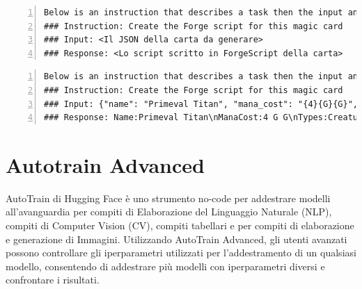 \begin{algorithm}[ht]
	\caption{Struttura prompt per l'addestramento}
	\label{lst:train_prompt_structure}
	\begin{Verbatim}[numbers=left,breaklines]
Below is an instruction that describes a task then the input and response. 
### Instruction: Create the Forge script for this magic card 
### Input: <Il JSON della carta da generare>
### Response: <Lo script scritto in ForgeScript della carta> 
	\end{Verbatim}
\end{algorithm}

\begin{algorithm}[ht]
	\caption{Esempio di prompt per l'addestramento}
	\label{lst:train_prompt_example}
    \scriptsize
	\begin{Verbatim}[numbers=left,breaklines]
Below is an instruction that describes a task then the input and response. 
### Instruction: Create the Forge script for this magic card 
### Input: {"name": "Primeval Titan", "mana_cost": "{4}{G}{G}", "type_line": "Creature \u2014 Giant", "oracle_text": "Trample\nWhenever Primeval Titan enters the battlefield or attacks, you may search your library for up to two land cards, put them onto the battlefield tapped, then shuffle.", "power": "6", "toughness": "6"} 
### Response: Name:Primeval Titan\nManaCost:4 G G\nTypes:Creature Giant\nPT:6/6\nK:Trample\nT:Mode$ ChangesZone | Origin$ Any | Destination$ Battlefield | ValidCard$ Card.Self | Execute$ TrigChange | OptionalDecider$ You | TriggerDescription$ Whenever CARDNAME enters the battlefield or attacks, you may search your library for up to two land cards, put them onto the battlefield tapped, then shuffle.\nT:Mode$ Attacks | ValidCard$ Card.Self | Execute$ TrigChange | TriggerZones$ Battlefield | OptionalDecider$ You | Secondary$ True | TriggerDescription$ Whenever CARDNAME enters the battlefield or attacks, you may search your library for up to two land cards, put them onto the battlefield tapped, then shuffle.\nSVar:TrigChange:DB$ ChangeZone | Origin$ Library | Destination$ Battlefield | Tapped$ True | ChangeType$ Land | ChangeNum$ 2 | ShuffleNonMandatory$ True\nSVar:HasAttackEffect:TRUE\nOracle:Trample\nWhenever Primeval Titan enters the battlefield or attacks, you may search your library for up to two land cards, put them onto the battlefield tapped, then shuffle.
	\end{Verbatim}
\end{algorithm}


\section{Autotrain Advanced}\label{sec:autotrain_advanced}
AutoTrain di Hugging Face è uno strumento no-code per addestrare modelli all'avanguardia per compiti di Elaborazione del Linguaggio Naturale (NLP),  compiti di Computer Vision (CV), compiti tabellari e per compiti di elaborazione e generazione di Immagini.
Utilizzando AutoTrain Advanced, gli utenti avanzati possono controllare gli iperparametri utilizzati per l'addestramento di un qualsiasi modello, consentendo di addestrare più modelli con iperparametri diversi e confrontare i risultati.




